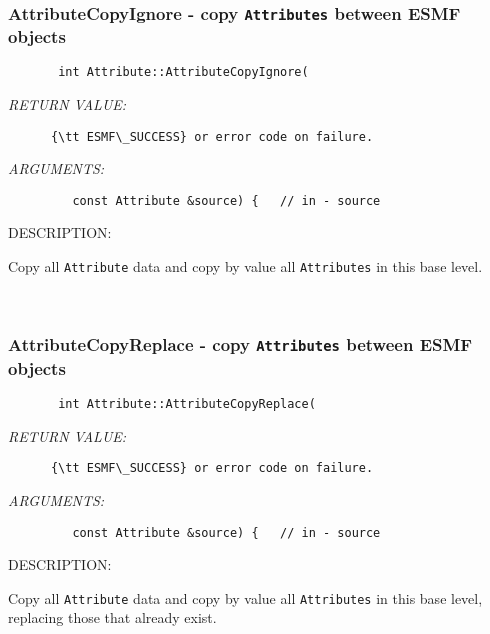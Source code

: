  
\mbox{}\hrulefill\
 
\subsubsection [AttributeCopyIgnore] {AttributeCopyIgnore - copy {\tt Attributes} between ESMF objects}


  
\begin{verbatim}       int Attribute::AttributeCopyIgnore(\end{verbatim}{\em RETURN VALUE:}
\begin{verbatim}      {\tt ESMF\_SUCCESS} or error code on failure.\end{verbatim}{\em ARGUMENTS:}
\begin{verbatim}         const Attribute &source) {   // in - source\end{verbatim}
{\sf DESCRIPTION:\\ }


     Copy all {\tt Attribute} data and copy by value all {\tt Attributes} in
     this base level.
   
 
\mbox{}\hrulefill\
 
\subsubsection [AttributeCopyReplace] {AttributeCopyReplace - copy {\tt Attributes} between ESMF objects}


  
\begin{verbatim}       int Attribute::AttributeCopyReplace(\end{verbatim}{\em RETURN VALUE:}
\begin{verbatim}      {\tt ESMF\_SUCCESS} or error code on failure.\end{verbatim}{\em ARGUMENTS:}
\begin{verbatim}         const Attribute &source) {   // in - source\end{verbatim}
{\sf DESCRIPTION:\\ }


     Copy all {\tt Attribute} data and copy by value all {\tt Attributes} in 
     this base level, replacing those that already exist.
   
